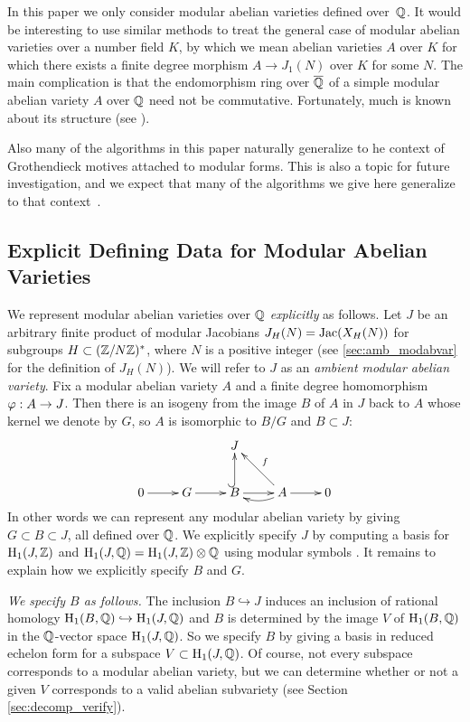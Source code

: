 \documentclass{article}
\begin{document}
\begin{remark}
    In this paper we only consider modular abelian varieties defined
    over~$\mathbb{Q}$.  It would be interesting to use similar methods to treat
    the general case of modular abelian varieties over a number field
    $K$, by which we mean abelian varieties $A$ over $K$ for which there
    exists a finite degree morphism $A\to J_1(N)$ over $K$ for some
    $N$. The main complication is that the endomorphism ring over
    $\overline{\mathbb{Q}}$ of a simple modular abelian variety $A$ over $\mathbb{Q}$ need not
    be commutative.  Fortunately, much is known about its structure (see
    \cite{ribet:twistsendoalg}).

    Also many of the algorithms in this paper naturally generalize to
    he context of Grothendieck motives attached to modular forms.  This
    is also a topic for future investigation, and we expect that many of the
    algorithms we give here generalize to that
    context~\cite{dummigan-stein-watkins:motives}.
\end{remark}



\subsection{Explicit Defining Data for Modular Abelian Varieties}
We represent modular abelian varieties over $\mathbb{Q}$ {\em explicitly} as
follows. Let $J$ be an arbitrary finite product of modular Jacobians
$J_H(N)=\operatorname{Jac}(X_H(N))$ for subgroups $H\subset (\mathbb{Z}/N\mathbb{Z})^*$, where
$N$ is a positive integer (see \ref{sec:amb_modabvar} for the definition
of $J_H(N)$).  We will refer to $J$ as an \emph{ambient modular abelian
variety}.
Fix a modular abelian variety $A$ and a
finite degree homomorphism $\varphi: A\to J$.  Then there is an isogeny
from the image $B$ of $A$ in $J$ back to $A$ whose kernel we denote by
$G$, so $A$ is isomorphic to $B/G$ and $B\subset J$:
$$
\xymatrix{
    & & J & & \\
    0\ar[r]& G \ar[r]& B\ar@{^(->}[u] \ar[r]& A\ar[r] \ar@/^/[l]\ar[ul]_{f} & 0
}
$$
In other words we can represent any modular abelian variety by giving $G\subset
B\subset J$, all defined over $\mathbb{Q}$. We explicitly specify $J$ by computing a
basis for $\operatorname{H}_1(J,\mathbb{Z})$ and $\operatorname{H}_1(J,\mathbb{Q})=\operatorname{H}_1(J,\mathbb{Z})\otimes \mathbb{Q}$ using modular
symbols \cite{stein:modform}. It remains to explain how we explicitly specify
$B$ and $G$.

{\em We specify $B$ as follows.}  The inclusion $B \hookrightarrow J$
induces an inclusion of rational homology $\operatorname{H}_1(B, \mathbb{Q}) \hookrightarrow
\operatorname{H}_1(J, \mathbb{Q})$ and $B$ is determined by the image $V$ of $\operatorname{H}_1(B,\mathbb{Q})$ in
the $\mathbb{Q}$-vector space $\operatorname{H}_1(J,\mathbb{Q})$.  So we specify $B$ by giving a basis in
reduced echelon form for a subspace $V \subset \operatorname{H}_1(J, \mathbb{Q})$. Of
course, not every subspace corresponds to a modular abelian variety,
but we can determine whether or not a given $V$ corresponds to a valid
abelian subvariety (see Section \ref{sec:decomp_verify}).
\end{document}
